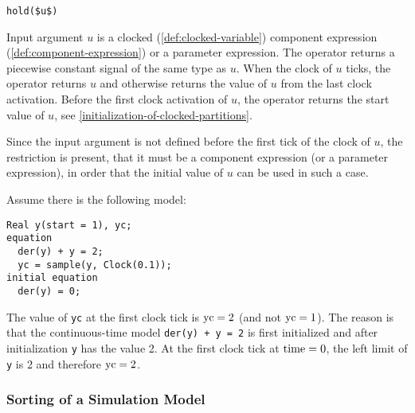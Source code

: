 \begin{operatordefinition}[hold]
\begin{synopsis}\begin{lstlisting}
hold($u$)
\end{lstlisting}\end{synopsis}
\begin{semantics}
Input argument $u$ is a clocked (\cref{def:clocked-variable}) component expression (\cref{def:component-expression}) or a parameter expression.
The operator returns a piecewise constant signal of the same type as $u$.
When the clock of $u$ ticks, the operator returns $u$ and otherwise returns the value of $u$ from the last clock activation.
Before the first clock activation of $u$, the operator returns the start value of $u$, see \cref{initialization-of-clocked-partitions}.
\begin{nonnormative}
Since the input argument is not defined before the first tick of the clock of $u$, the restriction is present, that it must be a component expression (or a parameter expression), in order that the initial value of $u$ can be used in such a case.
\end{nonnormative}
\end{semantics}
\end{operatordefinition}

\begin{example}
Assume there is the following model:
\begin{lstlisting}[language=modelica]
  Real y(start = 1), yc;
equation
  der(y) + y = 2;
  yc = sample(y, Clock(0.1));
initial equation
  der(y) = 0;
\end{lstlisting}

The value of \lstinline!yc! at the first clock tick is $\text{\lstinline!yc!} = 2$ (and not $\text{\lstinline!yc!} = 1$).  The reason is that the continuous-time model \lstinline!der(y) + y = 2! is first initialized and after initialization \lstinline!y! has the value 2.  At the first clock tick at $\text{\lstinline!time!} = 0$, the left limit of \lstinline!y! is 2 and therefore $\text{\lstinline!yc!} = 2$.
\end{example}

\subsubsection{Sorting of a Simulation Model}

